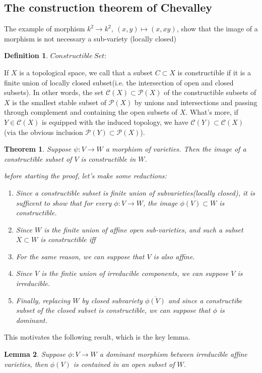 \documentclass[12pt,a4paper,english]{article}
\theoremstyle{plain}
\newtheorem{thm}{Theorem}[section]
\newtheorem{lem}[thm]{Lemma}
\theoremstyle{definition}
\newtheorem{defi}{Definition}
\theoremstyle{remark}
\begin{document}
\subsection{The construction theorem of Chevalley }
The example of morphism $k^{2}\rightarrow k^{2},\ (x,y)\mapsto (x,xy)$, show that the image of a morphism is not necessary a sub-variety (locally closed)
\begin{defi}
$Constructible\ Set$:

If $X$ is a topological space, we call that a subset $C\subset X$ is constructible if it is a finite union of locally closed subset(i.e. the intersection of open and closed subsets). In other words, the set $\mathcal{C}(X)\subset\mathcal{P}(X)$ of the constructible subsets of $X$ is the smallest stable subset of $\mathcal{P}(X)$ by unions and intersections and passing through complement and containing the open subsets of $X$. What's more, if $Y\in\mathcal{C}(X)$ is equipped with the induced topology, we have $\mathcal{C}(Y)\subset \mathcal{C}(X)$ (via the obvious inclusion $\mathcal{P}(Y)\subset\mathcal{P}(X)$).

\end{defi}
\begin{thm}\label{thmche}
Suppose $\psi:V\rightarrow W$ a morphism of varieties. Then the image of a constructible subset of $V$ is constructible in $W$.

before starting the proof, let's make some reductions:
\begin{enumerate}
    \item Since a constructible subset is finite union of subvarieties(locally closed), it is sufficent to show that for every $\phi:V\rightarrow W$, the image $\phi(V)\subset W$ is constructible.
    \item Since $W$ is the finite union of affine open sub-varieties, and such a subset $X\subset W$ is constructible iff 
    \item For the same reason, we can suppose that $V$ is also affine.
    \item Since $V$ is the fintie union of irreducible components, we can suppose $V$ is irreducible.
    \item Finally, replacing $W$ by closed subvariety $\overline{\phi(V)}$ and since a constructibe subset of the closed subset is constructible, we can suppose that $\phi$ is dominant.
\end{enumerate} 
\end{thm}
This motivates the following result, which is the key lemma.
\begin{lem}
Suppose $\phi:V\rightarrow W$ a dominant morphism between irreducible affine varieties, then $\phi(V)$ is contained in an open subset of $W$.
\end{lem}
\end{document}
